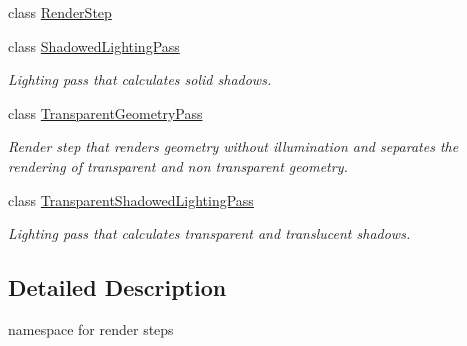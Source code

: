 \begin{DoxyCompactItemize}
class \mbox{\hyperlink{class_geometry_engine_1_1_geometry_render_step_1_1_render_step}{Render\+Step}}
\item 
class \mbox{\hyperlink{class_geometry_engine_1_1_geometry_render_step_1_1_shadowed_lighting_pass}{Shadowed\+Lighting\+Pass}}
\begin{DoxyCompactList}\small\item\em Lighting pass that calculates solid shadows. \end{DoxyCompactList}\item 
class \mbox{\hyperlink{class_geometry_engine_1_1_geometry_render_step_1_1_transparent_geometry_pass}{Transparent\+Geometry\+Pass}}
\begin{DoxyCompactList}\small\item\em Render step that renders geometry without illumination and separates the rendering of transparent and non transparent geometry. \end{DoxyCompactList}\item 
class \mbox{\hyperlink{class_geometry_engine_1_1_geometry_render_step_1_1_transparent_shadowed_lighting_pass}{Transparent\+Shadowed\+Lighting\+Pass}}
\begin{DoxyCompactList}\small\item\em Lighting pass that calculates transparent and translucent shadows. \end{DoxyCompactList}\end{DoxyCompactItemize}


\subsection{Detailed Description}
namespace for render steps 